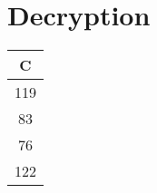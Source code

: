 \documentclass[11pt]{article}
\begin{document}
	
	
	\section{Decryption} %
	\label{sec:decryption}
	
	\begin{center}
		\begin{tabular}{|c|}
			\hline
		 \textbf{C}\\
		 \hline
		 119\\
		 \hline
		83\\
		\hline
		76\\
		\hline
		122\\
		\hline   
		\end{tabular}
	\end{center}
\end{document}
